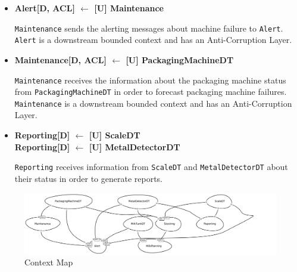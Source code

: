 \begin{itemize}
    \item \textbf{Alert[D, ACL] $\leftarrow$  [U] Maintenance}
    
    \texttt{Maintenance} sends the alerting messages about machine failure to \texttt{Alert}.
    \texttt{Alert} is a downstream bounded context and has an Anti-Corruption Layer.

	\item \textbf{Maintenance[D, ACL] $\leftarrow$  [U] PackagingMachineDT}
	
    \texttt{Maintenance} receives the information about the packaging machine status from \texttt{PackagingMachineDT} in order to forecast packaging machine failures.
    \texttt{Maintenance} is a downstream bounded context and has an Anti-Corruption Layer.

	\item \textbf{Reporting[D] $\leftarrow$  [U] ScaleDT \\
    Reporting[D] $\leftarrow$  [U] MetalDetectorDT }

    \texttt{Reporting} receives information from \texttt{ScaleDT} and \texttt{MetalDetectorDT} about their status in order to generate reports.
	

\end{itemize}

\begin{figure}[H]
    \centering
    \includegraphics[width=\textwidth]{img/context-map.png}
    \caption{Context Map}
    \label{img:context-map}
\end{figure}
